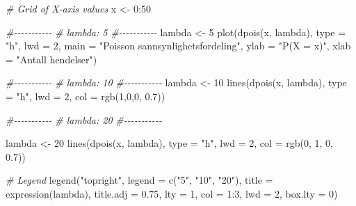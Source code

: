 \documentclass[
]{book}
\newenvironment{Shaded}{\begin{snugshade}}{\end{snugshade}}
\newcommand{\AttributeTok}[1]{\textcolor[rgb]{0.77,0.63,0.00}{#1}}
\newcommand{\CommentTok}[1]{\textcolor[rgb]{0.56,0.35,0.01}{\textit{#1}}}
\newcommand{\DecValTok}[1]{\textcolor[rgb]{0.00,0.00,0.81}{#1}}
\newcommand{\FloatTok}[1]{\textcolor[rgb]{0.00,0.00,0.81}{#1}}
\newcommand{\FunctionTok}[1]{\textcolor[rgb]{0.00,0.00,0.00}{#1}}
\newcommand{\NormalTok}[1]{#1}
\newcommand{\OtherTok}[1]{\textcolor[rgb]{0.56,0.35,0.01}{#1}}
\newcommand{\SpecialCharTok}[1]{\textcolor[rgb]{0.00,0.00,0.00}{#1}}
\newcommand{\StringTok}[1]{\textcolor[rgb]{0.31,0.60,0.02}{#1}}
\begin{document}
\begin{Shaded}
\begin{Highlighting}[]
\CommentTok{\# Grid of X{-}axis values}
\NormalTok{x }\OtherTok{\textless{}{-}} \DecValTok{0}\SpecialCharTok{:}\DecValTok{50}

\CommentTok{\#{-}{-}{-}{-}{-}{-}{-}{-}{-}{-}{-}}
\CommentTok{\# lambda: 5}
\CommentTok{\#{-}{-}{-}{-}{-}{-}{-}{-}{-}{-}{-}}
\NormalTok{lambda }\OtherTok{\textless{}{-}} \DecValTok{5}
\FunctionTok{plot}\NormalTok{(}\FunctionTok{dpois}\NormalTok{(x, lambda), }\AttributeTok{type =} \StringTok{"h"}\NormalTok{, }\AttributeTok{lwd =} \DecValTok{2}\NormalTok{,}
     \AttributeTok{main =} \StringTok{"Poisson sannsynlighetsfordeling"}\NormalTok{,}
     \AttributeTok{ylab =} \StringTok{"P(X = x)"}\NormalTok{, }\AttributeTok{xlab =} \StringTok{"Antall hendelser"}\NormalTok{)}

\CommentTok{\#{-}{-}{-}{-}{-}{-}{-}{-}{-}{-}{-}}
\CommentTok{\# lambda: 10}
\CommentTok{\#{-}{-}{-}{-}{-}{-}{-}{-}{-}{-}{-}}
\NormalTok{lambda }\OtherTok{\textless{}{-}} \DecValTok{10}
\FunctionTok{lines}\NormalTok{(}\FunctionTok{dpois}\NormalTok{(x, lambda), }\AttributeTok{type =} \StringTok{"h"}\NormalTok{, }\AttributeTok{lwd =} \DecValTok{2}\NormalTok{, }\AttributeTok{col =} \FunctionTok{rgb}\NormalTok{(}\DecValTok{1}\NormalTok{,}\DecValTok{0}\NormalTok{,}\DecValTok{0}\NormalTok{, }\FloatTok{0.7}\NormalTok{))}

\CommentTok{\#{-}{-}{-}{-}{-}{-}{-}{-}{-}{-}{-}}
\CommentTok{\# lambda: 20}
\CommentTok{\#{-}{-}{-}{-}{-}{-}{-}{-}{-}{-}{-}}

\NormalTok{lambda }\OtherTok{\textless{}{-}} \DecValTok{20}
\FunctionTok{lines}\NormalTok{(}\FunctionTok{dpois}\NormalTok{(x, lambda), }\AttributeTok{type =} \StringTok{"h"}\NormalTok{, }\AttributeTok{lwd =} \DecValTok{2}\NormalTok{, }\AttributeTok{col =} \FunctionTok{rgb}\NormalTok{(}\DecValTok{0}\NormalTok{, }\DecValTok{1}\NormalTok{, }\DecValTok{0}\NormalTok{, }\FloatTok{0.7}\NormalTok{))}

\CommentTok{\# Legend}
\FunctionTok{legend}\NormalTok{(}\StringTok{"topright"}\NormalTok{, }\AttributeTok{legend =} \FunctionTok{c}\NormalTok{(}\StringTok{"5"}\NormalTok{, }\StringTok{"10"}\NormalTok{, }\StringTok{"20"}\NormalTok{),}
       \AttributeTok{title =} \FunctionTok{expression}\NormalTok{(lambda), }\AttributeTok{title.adj =} \FloatTok{0.75}\NormalTok{,}
       \AttributeTok{lty =} \DecValTok{1}\NormalTok{, }\AttributeTok{col =} \DecValTok{1}\SpecialCharTok{:}\DecValTok{3}\NormalTok{, }\AttributeTok{lwd =} \DecValTok{2}\NormalTok{, }\AttributeTok{box.lty =} \DecValTok{0}\NormalTok{)}
\end{Highlighting}
\end{Shaded}
\end{document}
